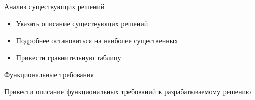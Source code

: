 \documentclass{fefu_presentation}
\begin{document}
    \begin{frame}{Анализ существующих решений}
        \begin{block}{}
            \begin{itemize}
                \item Указать описание существующих решений
                \item Подробнее остановиться на наиболее существенных
                \item Привести сравнительную таблицу
            \end{itemize}
        \end{block}

        \begin{fefucomparisontable}

            \convenient[$\pm$]
            \free
            \grade

            \grade

            \convenient
            \free

        \end{fefucomparisontable}
    \end{frame}

    \note{}

    \begin{frame}{Функциональные требования}
        \begin{block}{}
            Привести описание функциональных требований к разрабатываемому решению
        \end{block}
    \end{frame}

    \note{}
\end{document}
